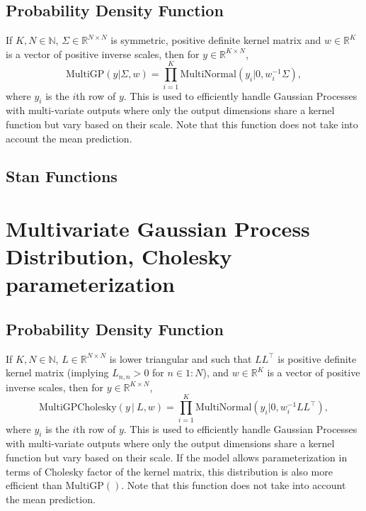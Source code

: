 \begin{description}
{\begin{description}
\subsection{Probability Density Function}


If $K,N \in \mathbb{N}$, $\Sigma \in \mathbb{R}^{N \times N}$ is symmetric, positive definite kernel matrix and $w \in \mathbb{R}^{K}$ is a vector of positive inverse scales, then for $y \in \mathbb{R}^{K \times N}$, \[ \text{MultiGP}(y|\Sigma,w) = \prod_{i=1}^{K} \text{MultiNormal}(y_i|0,w_i^{-1} \Sigma), \] where $y_i$ is the $i$th row of $y$.  This is used to efficiently handle Gaussian Processes with multi-variate outputs where only the output dimensions share a kernel function but vary based on their scale.  Note that this function does not take into account the mean prediction.




\subsection{Stan Functions}


\begin{description}  \end{description}


\section{Multivariate Gaussian Process Distribution, Cholesky parameterization}


\subsection{Probability Density Function}


If $K,N \in \mathbb{N}$, $L \in \mathbb{R}^{N \times N}$ is lower triangular and such that $LL^{\top}$ is positive definite kernel matrix (implying $L_{n,n} > 0$ for $n \in 1{:}N$), and $w \in \mathbb{R}^{K}$ is a vector of positive inverse scales, then for $y \in \mathbb{R}^{K \times N}$, \[ \text{MultiGPCholesky}(y \, | \ L,w) = \prod_{i=1}^{K} \text{MultiNormal}(y_i|0,w_i^{-1} LL^{\top}), \] where $y_i$ is the $i$th row of $y$.  This is used to efficiently handle Gaussian Processes with multi-variate outputs where only the output dimensions share a kernel function but vary based on their scale.  If the model allows parameterization in terms of Cholesky factor of the kernel matrix, this distribution is also more efficient than $\text{MultiGP}()$. Note that this function does not take into account the mean prediction.



\end{description}}
\end{description}
